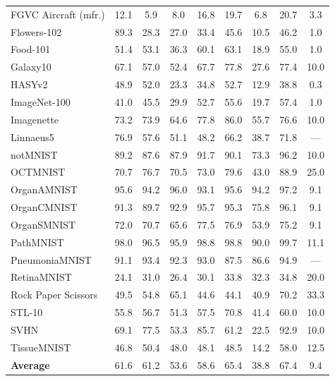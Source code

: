 \begin{tabular}{l c c c c c c c c }
FGVC Aircraft (mfr.) & 12.1 & 5.9 & 8.0 & 16.8 & 19.7 & 6.8 & 20.7 & 3.3 \\
Flowers-102 & 89.3 & 28.3 & 27.0 & 33.4 & 45.6 & 10.5 & 46.2 & 1.0 \\
Food-101 & 51.4 & 53.1 & 36.3 & 60.1 & 63.1 & 18.9 & 55.0 & 1.0 \\
Galaxy10 & 67.1 & 57.0 & 52.4 & 67.7 & 77.8 & 27.6 & 77.4 & 10.0 \\
HASYv2 & 48.9 & 52.0 & 23.3 & 34.8 & 52.7 & 12.9 & 38.8 & 0.3 \\
ImageNet-100 & 41.0 & 45.5 & 29.9 & 52.7 & 55.6 & 19.7 & 57.4 & 1.0 \\
Imagenette & 73.2 & 73.9 & 64.6 & 77.8 & 86.0 & 55.7 & 76.6 & 10.0 \\
Linnaeus5 & 76.9 & 57.6 & 51.1 & 48.2 & 66.2 & 38.7 & 71.8 & --- \\
notMNIST & 89.2 & 87.6 & 87.9 & 91.7 & 90.1 & 73.3 & 96.2 & 10.0 \\
OCTMNIST & 70.7 & 76.7 & 70.5 & 73.0 & 79.6 & 43.0 & 88.9 & 25.0 \\
OrganAMNIST & 95.6 & 94.2 & 96.0 & 93.1 & 95.6 & 94.2 & 97.2 & 9.1 \\
OrganCMNIST & 91.3 & 89.7 & 92.9 & 95.7 & 95.3 & 75.8 & 96.1 & 9.1 \\
OrganSMNIST & 72.0 & 70.7 & 65.6 & 77.5 & 76.9 & 53.9 & 75.2 & 9.1 \\
PathMNIST & 98.0 & 96.5 & 95.9 & 98.8 & 98.8 & 90.0 & 99.7 & 11.1 \\
PneumoniaMNIST & 91.1 & 93.4 & 92.3 & 93.0 & 87.5 & 86.6 & 94.9 & --- \\
RetinaMNIST & 24.1 & 31.0 & 26.4 & 30.1 & 33.8 & 32.3 & 34.8 & 20.0 \\
Rock Paper Scissors & 49.5 & 54.8 & 65.1 & 44.6 & 44.1 & 40.9 & 70.2 & 33.3 \\
STL-10 & 55.8 & 56.7 & 51.3 & 57.5 & 70.8 & 41.4 & 60.0 & 10.0 \\
SVHN & 69.1 & 77.5 & 53.3 & 85.7 & 61.2 & 22.5 & 92.9 & 10.0 \\
TissueMNIST & 46.8 & 50.4 & 48.0 & 48.1 & 48.5 & 14.2 & 58.0 & 12.5 \\
\midrule
\textbf{Average} & 61.6 & 61.2 & 53.6 & 58.6 & 65.4 & 38.8 & 67.4 & 9.4 \\
\bottomrule
\end{tabular}
